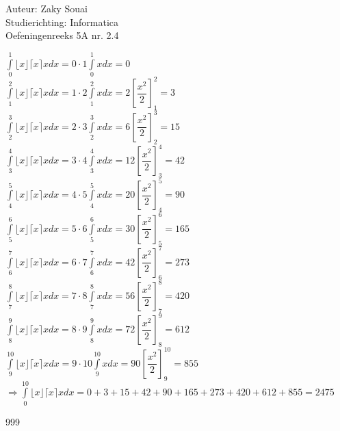 \documentclass[a4paper]{article}
\begin{document}
  
\noindent \large Auteur: Zaky Souai \\
\noindent \large Studierichting:  Informatica\\
\noindent \large Oefeningenreeks 5A nr. 2.4\\

\bigskip

\normalsize

$ \displaystyle\int\limits_0^1\lfloor x\rfloor \lceil x\rceil x dx=0\cdot1\displaystyle\int\limits_0^1x dx =0 $\\

$ \displaystyle\int\limits_1^2\lfloor x\rfloor \lceil x\rceil x dx=1\cdot2\displaystyle\int\limits_1^2x dx=2\left[\dfrac{x^2}{2}\right]_1^2=3 $\\

$ \displaystyle\int\limits_2^3\lfloor x\rfloor \lceil x\rceil x dx=2\cdot3\displaystyle\int\limits_2^3x dx=6\left[\dfrac{x^2}{2}\right]_2^3=15 $\\

$ \displaystyle\int\limits_3^4\lfloor x\rfloor \lceil x\rceil x dx=3\cdot4\displaystyle\int\limits_3^4x dx=12\left[\dfrac{x^2}{2}\right]_3^4=42 $\\

$ \displaystyle\int\limits_4^5\lfloor x\rfloor \lceil x\rceil x dx=4\cdot5\displaystyle\int\limits_4^5x dx=20\left[\dfrac{x^2}{2}\right]_4^5=90 $\\

$ \displaystyle\int\limits_5^6\lfloor x\rfloor \lceil x\rceil x dx=5\cdot6\displaystyle\int\limits_5^6x dx=30\left[\dfrac{x^2}{2}\right]_5^6=165 $\\

$ \displaystyle\int\limits_6^7\lfloor x\rfloor \lceil x\rceil x dx=6\cdot7\displaystyle\int\limits_6^7x dx=42\left[\dfrac{x^2}{2}\right]_6^7=273 $\\

$ \displaystyle\int\limits_7^8\lfloor x\rfloor \lceil x\rceil x dx=7\cdot8\displaystyle\int\limits_7^8x dx=56\left[\dfrac{x^2}{2}\right]_7^8=420 $\\

$ \displaystyle\int\limits_8^9\lfloor x\rfloor \lceil x\rceil x dx=8\cdot9\displaystyle\int\limits_8^9x dx=72\left[\dfrac{x^2}{2}\right]_8^9=612 $\\

$ \displaystyle\int\limits_9^{10}\lfloor x\rfloor \lceil x\rceil x dx=9\cdot10\displaystyle\int\limits_9^{10}x dx=90\left[\dfrac{x^2}{2}\right]_9^{10}=855 $\\

$ \Rightarrow \displaystyle\int\limits_0^{10}\lfloor x\rfloor \lceil x\rceil x dx = 0+3+15+42+90+165+273+420+612+855 = 2475 $\\

\begin{thebibliography}{999}
\end{thebibliography}
\end{document}
